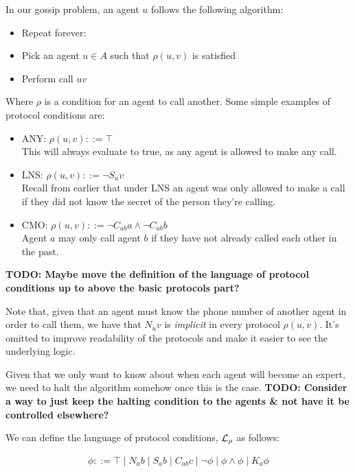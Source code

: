 \documentclass[12pt, a4paper]{article} %
\begin{document}
In our gossip problem, an agent $u$ follows the following algorithm:

\begin{itemize}
    \item Repeat forever:
    \item Pick an agent $u \in A$ such that $\rho(u, v)$ is satisfied
    \item Perform call $uv$
\end{itemize}

Where $\rho$ is a condition for an agent to call another. Some simple examples of protocol conditions are:

\begin{itemize}
    \item \textsf{ANY}: $\rho(u, v) ::= \top$ \\
    This will always evaluate to true, as any agent is allowed to make any call.
    \item \textsf{LNS}: $\rho(u, v) ::= \neg S_u v$ \\
    Recall from earlier that under \textsf{LNS} an agent was only allowed to make a call if they did not know the secret of the person they're calling.
    \item \textsf{CMO}: $\rho(u, v) ::= \neg C_{ab}a \land \neg C_{ab}b$ \\
    Agent $a$ may only call agent $b$ if they have not already called each other in the past.
\end{itemize}

\textbf{TODO: Maybe move the definition of the language of protocol conditions up to above the basic protocols part?}

Note that, given that an agent must know the phone number of another agent in order to call them, we have that $N_u v$ is \textit{implicit} in every protocol $\rho(u, v)$. It's omitted to improve readability of the protocols and make it easier to see the underlying logic.

Given that we only want to know about when each agent will become an expert, we need to halt the algorithm somehow once this is the case. \textbf{TODO: Consider a way to just keep the halting condition to the agents \& not have it be controlled elsewhere?}

We can define the language of protocol conditions, $\mathcal{L}_\rho$ as follows:

\begin{align}
    \phi ::= \top \mid N_a b \mid S_a b \mid C_{ab} c \mid \neg \phi \mid \phi \land \phi \mid K_a \phi
\end{align}
\end{document}

